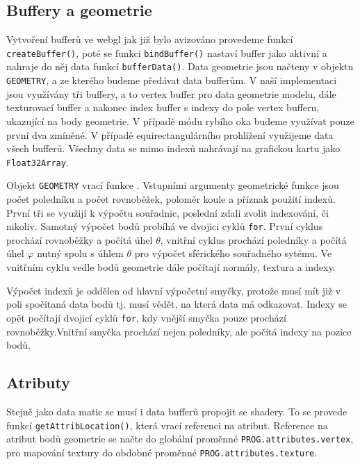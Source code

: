 \newpage


\subsection{Buffery a geometrie}

Vytvoření bufferů ve webgl jak již bylo avizováno provedeme funkcí \texttt{createBuffer()}, poté se funkci   \texttt{bindBuffer()}  nastaví buffer jako  aktivní  a  nahraje do něj  data    funkcí \texttt{bufferData()}. Data geometrie jsou načteny v objektu \texttt{GEOMETRY}, a ze kterého  budeme předávat data bufferům. V naší implementaci jsou využívány tři buffery, a to vertex buffer pro data geometrie modelu, dále texturovací buffer a nakonec index buffer s indexy do pole vertex bufferu, ukazující na body geometrie. V případě módu rybího oka budeme využívat pouze první dva zmíněné. V případě equirectangulárního prohlížení využijeme data všech bufferů. Všechny data se mimo indexů nahrávají na grafickou kartu jako \texttt{Float32Array}.


Objekt \texttt{GEOMETRY} vrací funkce \texttt{\createSphereGeometry}. Vstupními argumenty geometrické funkce jsou počet poledníku a počet rovnoběžek, poloměr koule a příznak použití indexů. První tři se využijí k výpočtu souřadnic, poslední zdali zvolit indexování, či nikoliv. Samotný výpočet bodů probíhá ve dvojici cyklů \texttt{for}. První cyklus prochází rovnoběžky a počítá úhel $\theta$, vnitřní cyklus prochází poledníky a počítá úhel $\varphi$ nutný spolu s úhlem $\theta$ pro výpočet sférického souřadného sytému. Ve vnitřním cyklu vedle bodů geometrie dále počítají normály, textura a indexy.


Výpočet indexů je oddělen od hlavní výpočetní smyčky, protože musí mít již v poli spočítaná data bodů tj. musí vědět, na která data má odkazovat. Indexy se opět počítají dvojicí cyklů \texttt{for}, kdy vnější smyčka pouze prochází rovnoběžky.Vnitřní smyčka prochází nejen poledníky, ale počítá indexy na pozice bodů.

\subsection{Atributy}
Stejně jako data matic se musí i data bufferů propojit se shadery. To se provede funkcí \texttt{getAttribLocation()}, která vrací referenci na atribut. Reference na atribut bodů geometrie se načte   do globální proměnné \texttt{PROG.attributes.vertex}, pro mapování textury do obdobné proměnné \texttt{PROG.attributes.texture}.



